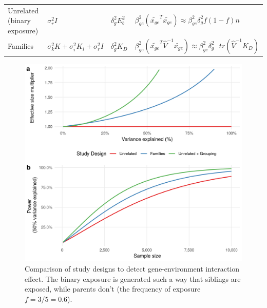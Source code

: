 \documentclass[]{book}
\begin{document}
\begin{longtable}[]{@{}llll@{}}
\begin{minipage}[t]{0.18\columnwidth}\raggedright\strut
Unrelated (binary exposure)\strut
\end{minipage} & \begin{minipage}[t]{0.09\columnwidth}\raggedright\strut
\(\sigma_r^2 I\)\strut
\end{minipage} & \begin{minipage}[t]{0.07\columnwidth}\raggedright\strut
\(\delta_g^2 E_b^2\)\strut
\end{minipage} & \begin{minipage}[t]{0.42\columnwidth}\raggedright\strut
\(\beta^2_{ge} (\tilde{x_{ge}}^T \tilde{x_{ge}}) \approx \beta^2_{ge} \delta_g^2 f (1 -f) n\)\strut
\end{minipage}\tabularnewline
\begin{minipage}[t]{0.18\columnwidth}\raggedright\strut
Families\strut
\end{minipage} & \begin{minipage}[t]{0.09\columnwidth}\raggedright\strut
\(\sigma_k^2 K + \sigma_i^2 K_i + \sigma_r^2 I\)\strut
\end{minipage} & \begin{minipage}[t]{0.07\columnwidth}\raggedright\strut
\(\delta_g^2 K_D\)\strut
\end{minipage} & \begin{minipage}[t]{0.42\columnwidth}\raggedright\strut
\(\beta^2_{ge} (\tilde{x_{ge}}^T \hat{V}^{-1} \tilde{x_{ge}}) \approx \beta^2_{ge} \delta_g^2 \mbox { } tr(\hat{V}^{-1} K_D)\)\strut
\end{minipage}\tabularnewline
\bottomrule
\end{longtable}

\begin{figure}

{\centering \includegraphics[width=0.75\linewidth]{figures/09-figure-power-interaction-expsib-two-panels} 

}

\caption{Comparison of study designs to detect
gene-environment interaction effect. The binary exposure is generated
such a way that siblings are exposed, while parents don't (the frequency
of exposure \(f = 3/5 = 0.6\)).}\label{fig:power-interaction}
\end{figure}
\end{document}
